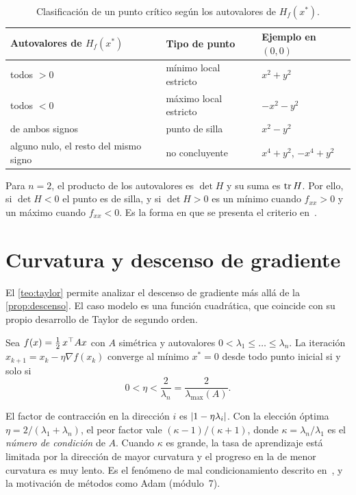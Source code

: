 \begin{table}[h]
\centering\small
\caption{Clasificación de un punto crítico según los autovalores de $H_f(x^{*})$.}\label{tab:criterio}
\begin{tabular}{@{}lll@{}}
\toprule
Autovalores de $H_f(x^{*})$ & Tipo de punto & Ejemplo en $(0,0)$ \\
\midrule
todos $>0$ & mínimo local estricto & $x^{2}+y^{2}$ \\
todos $<0$ & máximo local estricto & $-x^{2}-y^{2}$ \\
de ambos signos & punto de silla & $x^{2}-y^{2}$ \\
alguno nulo, el resto del mismo signo & no concluyente & $x^{4}+y^{2}$, $-x^{4}+y^{2}$ \\
\bottomrule
\end{tabular}
\end{table}

\begin{observacion}
Para $n=2$, el producto de los autovalores es $\det H$ y su suma es $\operatorname{tr} H$. Por ello, si $\det H<0$ el punto es de silla, y si $\det H>0$ es un mínimo cuando $f_{xx}>0$ y un máximo cuando $f_{xx}<0$. Es la forma en que se presenta el criterio en~\cite[clase~9]{mit1802}.
\end{observacion}

\addtocounter{definicion}{1}%

\section{Curvatura y descenso de gradiente}

El \cref{teo:taylor} permite analizar el descenso de gradiente más allá de la \cref{prop:descenso}. El caso modelo es una función cuadrática, que coincide con su propio desarrollo de Taylor de segundo orden.

\begin{proposicion}\label{prop:dg-cuadratica}
Sea $f(x)=\tfrac12\,x^{\top} Ax$ con $A$ simétrica y autovalores $0<\lambda_1\le\dots\le\lambda_n$. La iteración $x_{k+1}=x_k-\eta\nabla f(x_k)$ converge al mínimo $x^{*}=0$ desde todo punto inicial si y solo si
\[
0<\eta<\frac{2}{\lambda_n}=\frac{2}{\lambda_{\max}(A)}.
\]
\end{proposicion}

\addtocounter{definicion}{1}%

\begin{observacion}
El factor de contracción en la dirección $i$ es $\lvert1-\eta\lambda_i\rvert$. Con la elección óptima $\eta=2/(\lambda_1+\lambda_n)$, el peor factor vale $(\kappa-1)/(\kappa+1)$, donde $\kappa=\lambda_n/\lambda_1$ es el \emph{número de condición} de $A$. Cuando $\kappa$ es grande, la tasa de aprendizaje está limitada por la dirección de mayor curvatura y el progreso en la de menor curvatura es muy lento. Es el fenómeno de mal condicionamiento descrito en~\cite[§4.2 y §4.3.1]{gbc}, y la motivación de métodos como Adam (módulo~7).
\end{observacion}

